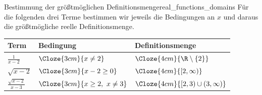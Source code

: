 \begin{minipage}{\linewidth}
\begin{ExampleBox}{Bestimmung der größtmöglichen Definitionsmenge}{real_functions_domains}
  Für die folgenden drei Terme bestimmen wir jeweils die Bedingungen an $x$
  und daraus die größtmögliche reelle Definitionsmenge.
  \begin{center}
    \renewcommand{\arraystretch}{1.9}
    \setlength{\tabcolsep}{15pt}
    \begin{tabular}{@{}lll@{}}
      \toprule
      Term & Bedingung & Definitionsmenge\\
      \midrule
      $\displaystyle\frac1{x-2}$ & $\Cloze{3cm}{x\ne2}$ &
        $\Cloze{4cm}{\R\setminus\{2\}}$\\
      $\sqrt{x-2}$ & $\Cloze{3cm}{x-2\ge0}$ &
        $\Cloze{4cm}{[2,\infty)}$\\
      $\displaystyle\frac{\sqrt{x-2}}{x-3}$ &
        $\Cloze{3cm}{x\ge2,\ x\ne3}$ &
        $\Cloze{4cm}{[2,3)\cup(3,\infty)}$\\
      \bottomrule
    \end{tabular}
  \end{center}
\end{ExampleBox}
\end{minipage}

